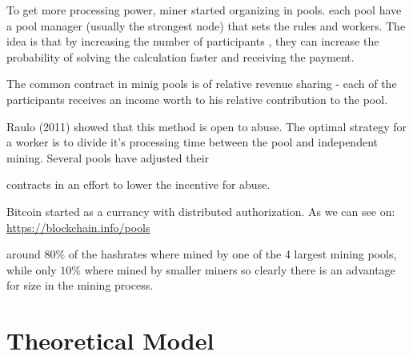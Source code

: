 \documentclass{article}
\begin{document}
 To get more processing power, miner started organizing in pools. each pool have a pool manager (usually the strongest node) that sets the rules and workers. The idea is that by increasing the number of participants , they can increase the probability of solving the calculation faster and receiving the payment.

 The common contract in minig pools is of relative revenue sharing - each of the participants receives an income worth to his relative contribution to the pool. 

 Raulo (2011) showed that this method is open to abuse. The optimal strategy for a worker is to divide it's processing time between the pool and independent mining. Several pools have adjusted their

 contracts in an effort to lower the incentive for abuse.


Bitcoin started as a currancy with distributed authorization. As we can see on:\\
\href{https://blockchain.info/pools}{https://blockchain.info/pools}

around $80\%$ of the hashrates where mined by one of the 4 largest mining pools, while only $10\%$ where mined by smaller miners so clearly there is an advantage for size in the mining process. 


\section{Theoretical Model}




 
\end{document}
